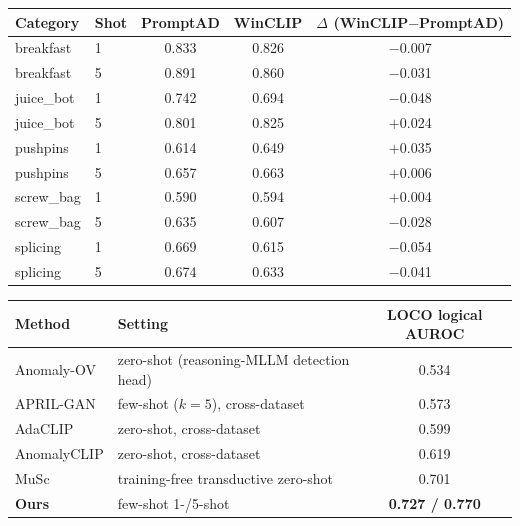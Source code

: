 \documentclass{article}
\begin{document}
\begin{center}
\begin{tabular}{llccc}
\toprule
Category & Shot & PromptAD & WinCLIP & $\Delta$ (WinCLIP$-$PromptAD) \\
\midrule
breakfast  & 1 & 0.833 & 0.826 & $-$0.007 \\
breakfast  & 5 & 0.891 & 0.860 & $-$0.031 \\
juice\_bot & 1 & 0.742 & 0.694 & $-$0.048 \\
juice\_bot & 5 & 0.801 & 0.825 & $+$0.024 \\
pushpins   & 1 & 0.614 & 0.649 & $+$0.035 \\
pushpins   & 5 & 0.657 & 0.663 & $+$0.006 \\
screw\_bag & 1 & 0.590 & 0.594 & $+$0.004 \\
screw\_bag & 5 & 0.635 & 0.607 & $-$0.028 \\
splicing   & 1 & 0.669 & 0.615 & $-$0.054 \\
splicing   & 5 & 0.674 & 0.633 & $-$0.041 \\
\bottomrule
\end{tabular}
\end{center}


\begin{center}
\begin{tabular}{llc}
\toprule
Method & Setting & LOCO logical AUROC \\
\midrule
Anomaly-OV   & zero-shot (reasoning-MLLM detection head) & 0.534 \\
APRIL-GAN    & few-shot ($k{=}5$), cross-dataset         & 0.573 \\
AdaCLIP      & zero-shot, cross-dataset                  & 0.599 \\
AnomalyCLIP  & zero-shot, cross-dataset                  & 0.619 \\
MuSc         & training-free transductive zero-shot      & 0.701 \\
\midrule
\textbf{Ours} & few-shot 1-/5-shot                        & \textbf{0.727 / 0.770} \\
\bottomrule
\end{tabular}
\end{center}
\end{document}
